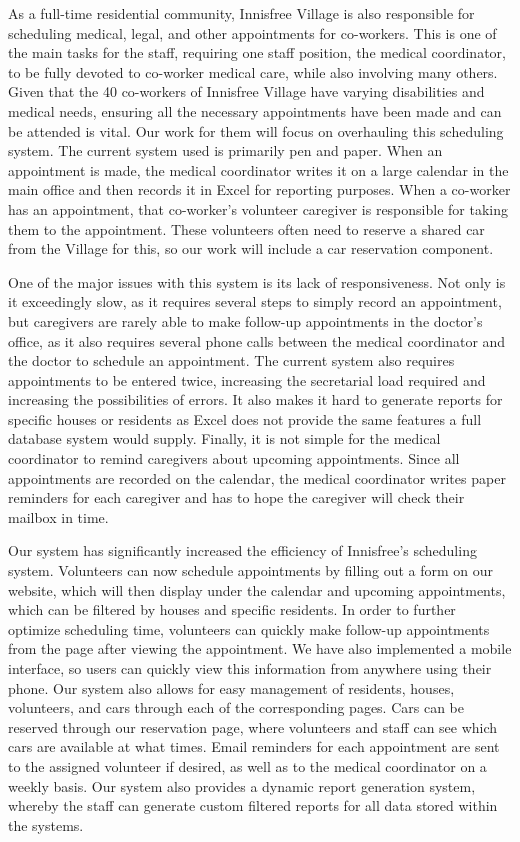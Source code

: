 \documentclass{sig-alternate}
\begin{document}
As a full-time residential community, Innisfree Village is also responsible for scheduling medical, legal, and other appointments for co-workers. This is one of the main tasks for the staff, requiring one staff position, the medical coordinator, to be fully devoted to co-worker medical care, while also involving many others. Given that the 40 co-workers of Innisfree Village have varying disabilities and medical needs, ensuring all the necessary appointments have been made and can be attended is vital. Our work for them will focus on overhauling this scheduling system. The current system used is primarily pen and paper. When an appointment is made, the medical coordinator writes it on a large calendar in the main office and then records it in Excel for reporting purposes. When a co-worker has an appointment, that co-worker’s volunteer caregiver is responsible for taking them to the appointment. These volunteers often need to reserve a shared car from the Village for this, so our work will include a car reservation component.

One of the major issues with this system is its lack of responsiveness. Not only is it exceedingly slow, as it requires several steps to simply record an appointment, but caregivers are rarely able to make follow-up appointments in the doctor’s office, as it also requires several phone calls between the medical coordinator and the doctor to schedule an appointment. The current system also requires appointments to be entered twice, increasing the secretarial load required and increasing the possibilities of errors. It also makes it hard to generate reports for specific houses or residents as Excel does not provide the same features a full database system would supply. Finally, it is not simple for the medical coordinator to remind caregivers about upcoming appointments. Since all appointments are recorded on the calendar, the medical coordinator writes paper reminders for each caregiver and has to hope the caregiver will check their mailbox in time.

Our system has significantly increased the efficiency of Innisfree's scheduling system. Volunteers can now schedule appointments by filling out a form on our website, which will then display under the calendar and upcoming appointments, which can be filtered by houses and specific residents. In order to further optimize scheduling time, volunteers can quickly make follow-up appointments from the page after viewing the appointment. We have also implemented a mobile interface, so users can quickly view this information from anywhere using their phone. Our system also allows for easy management of residents, houses, volunteers, and cars through each of the corresponding pages. Cars can be reserved through our reservation page, where volunteers and staff can see which cars are available at what times. Email reminders for each appointment are sent to the assigned volunteer if desired, as well as to the medical coordinator on a weekly basis. Our system also provides a dynamic report generation system, whereby the staff can generate custom filtered reports for all data stored within the systems.
\end{document}
